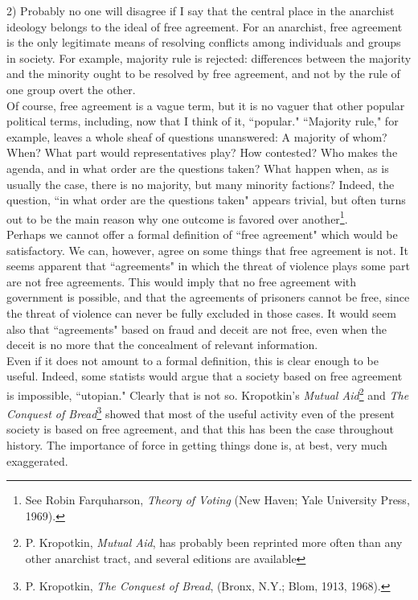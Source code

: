 \documentclass[12pt, onecolumn, letterpaper, oneside]{book}
\begin{document}
2) Probably no one will disagree if I say that the central place in the anarchist ideology belongs to the ideal of free agreement. For an anarchist, free agreement is the only legitimate means of resolving conflicts among individuals and groups in society. For example, majority rule is rejected: differences between the majority and the minority ought to be resolved by free agreement, and not by the rule of one group overt the other.\\
Of course, free agreement is a vague term, but it is no vaguer that other popular political terms, including, now that I think of it, ``popular." ``Majority rule," for example, leaves a whole sheaf of questions unanswered: A majority of whom? When? What part would representatives play? How contested? Who makes the agenda, and in what order are the questions taken? What happen when, as is usually the case, there is no majority, but many minority factions? Indeed, the question, ``in what order are the questions taken" appears trivial, but often turns out to be the main reason why one outcome is favored over another\footnote{See Robin Farquharson, \emph{Theory of Voting} (New Haven; Yale University Press, 1969).}.\\
Perhaps we cannot offer a formal definition of ``free agreement" which would be satisfactory. We can, however, agree on some things that free agreement is not. It seems apparent that ``agreements" in which the threat of violence plays some part are not free agreements. This would imply that no free agreement with government is possible, and that the agreements of prisoners cannot be free, since the threat of violence can never be fully excluded in those cases. It would seem also that ``agreements" based on fraud and deceit are not free, even when the deceit is no more that the concealment of relevant information.\\
Even if it does not amount to a formal definition, this is clear enough to be useful. Indeed, some statists would argue that a society based on free agreement is impossible, ``utopian." Clearly that is not so. Kropotkin's \emph{Mutual Aid}\footnote{P. Kropotkin, \emph{Mutual Aid}, has probably been reprinted more often than any other anarchist tract, and several editions are available} and \emph{The Conquest of Bread}\footnote{P. Kropotkin, \emph{The Conquest of Bread}, (Bronx, N.Y.; Blom, 1913, 1968).} showed that most of the useful activity even of the present society is based on free agreement, and that this has been the case throughout history. The importance of force in getting things done is, at best, very much exaggerated.\\
\end{document}
